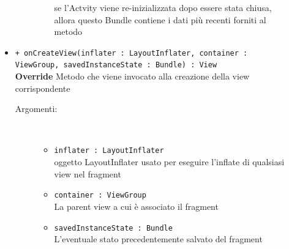 \documentclass[../DefinizioneDiProdotto.tex]{subfiles}
\begin{document}
\begin{description}
\begin{itemize}
\begin{description}
\begin{itemize}
				se l'Actvity viene re-inizializzata dopo essere stata chiusa, allora questo Bundle contiene i dati più recenti forniti al metodo\end{itemize}
		\end{description}
		\item \texttt{+ onCreateView(inflater : LayoutInflater, container : ViewGroup, savedInstanceState : Bundle) : View}\\
		\textbf{Override} Metodo che viene invocato alla creazione della view corrispondente
		\begin{description}
			\item[Argomenti:] \
			\begin{itemize}
				\item \texttt{inflater : LayoutInflater}\\
				oggetto LayoutInflater usato per eseguire l'inflate di qualsiasi view nel fragment\item \texttt{container : ViewGroup}\\
				La parent view a cui è associato il fragment\item \texttt{savedInstanceState : Bundle}\\
				L'eventuale stato precedentemente salvato del fragment\end{itemize}
		\end{description}
	\end{itemize}
\end{description}
\end{document}
